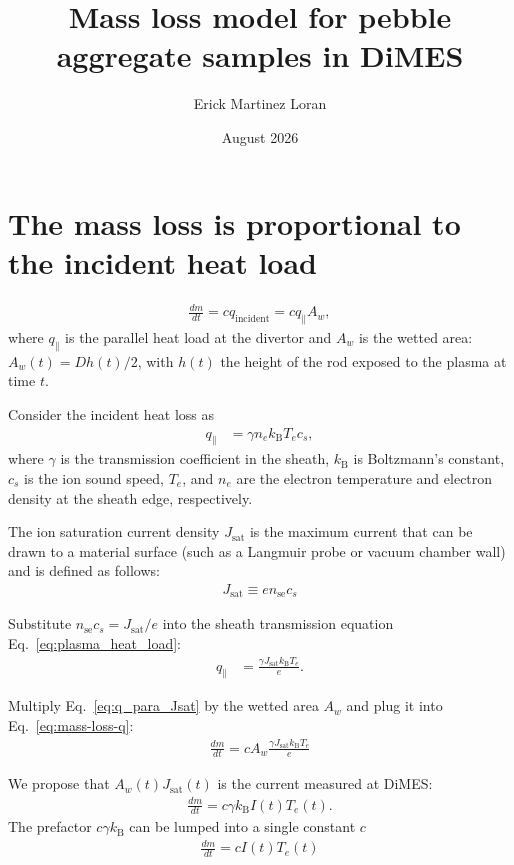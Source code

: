 \documentclass[11pt,twoside]{article}
\title{Mass loss model for pebble aggregate samples in DiMES}
\author{Erick Martinez Loran}
\date{August 2026}
\begin{document}
\maketitle

\section{The mass loss is proportional to the incident heat load}
\begin{align}
\frac{dm}{dt} = c q_{\mathrm{incident}} =  c q_{\parallel} \label{eq:mass-loss-q} A_w,
\end{align}
where $q_{\parallel}$ is the parallel heat load at the divertor and $A_w$ is the wetted area: $A_w(t) = Dh(t)/2$, with $h(t)$ the height of the rod exposed to the plasma at time $t$.

Consider the incident heat loss as
\begin{align}
q_{\parallel} &= \gamma n_e k_{\mathrm{B}} T_e c_s, \label{eq:plasma_heat_load}
\end{align}
where $\gamma$ is the transmission coefficient in the sheath, $k_{\mathrm{B}}$ is Boltzmann's constant, $c_s$ is the ion sound speed, $T_e$, and $n_e$ are the electron temperature and electron density at the sheath edge, respectively.

The ion saturation current density $J_{\mathrm{sat}}$ is the maximum current that can be drawn to a material surface (such as a Langmuir probe or vacuum chamber wall) and is defined as follows:
\begin{align}
J_{\mathrm{sat}} \equiv e n_{\mathrm{se}} c_s \label{eq:ion-saturation}
\end{align}

Substitute $n_{\mathrm{se}} c_s = J_{\mathrm{sat}} /e$ into the sheath transmission equation Eq.~\eqref{eq:plasma_heat_load}:
\begin{align}
q_{\parallel} &= \frac{\gamma J_{\mathrm{sat}} k_{\mathrm{B}} T_e}{e}. \label{eq:q_para_Jsat}
\end{align}

Multiply Eq.~\eqref{eq:q_para_Jsat} by the wetted area $A_w$ and plug it into Eq.~\eqref{eq:mass-loss-q}:
\begin{align}
\frac{dm}{dt} = c A_w \frac{\gamma J_{\mathrm{sat}} k_{\mathrm{B}} T_e}{e}
\end{align}

We propose that $A_w(t) J_{\mathrm{sat}} (t)$ is the current measured at DiMES:
\begin{align*}
\frac{dm}{dt} = c \gamma k_{\mathrm{B}} I(t)  T_e(t).
\end{align*}
The prefactor $c \gamma k_{\mathrm{B}}$ can be lumped into a single constant $c$
\begin{align}
\boxed{
\frac{dm}{dt} = c I(t) T_e(t) \label{eq:mass-loss-I}
}
\end{align}
\end{document}
